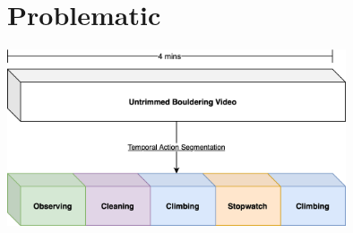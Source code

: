 \section{Problematic}

\begin{frame}

    \vspace{1em}

    \centering
    \includegraphics[width=0.75\textwidth]{../../assets/visuals/temporal-action-segmentation-visual.png}

    \cite{tas-survey}
    
\end{frame}
